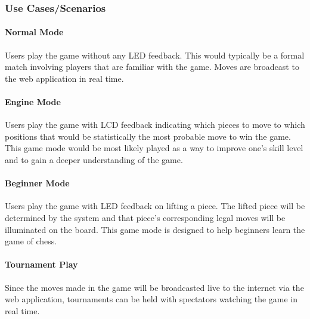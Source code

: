 \documentclass[12pt]{article}
\begin{document}
\subsubsection{Use Cases/Scenarios}{
    
    \paragraph{Normal Mode}{
        Users play the game without any LED feedback. This would typically be a formal match involving players that are familiar with the game. Moves are broadcast to the
        web application in real time.
    }
        
    \paragraph{Engine Mode}{
        Users play the game with LCD feedback indicating which pieces to move to which positions that would be statistically the most probable move to win the game. This game mode would
        be most likely played as a way to improve one's skill level and to gain a deeper understanding of the game.
    }
    
    \paragraph{Beginner Mode}{
        Users play the game with LED feedback on lifting a piece. The lifted piece will be determined by the system and that piece's corresponding legal moves will be illuminated on the board. This game
        mode is designed to help beginners learn the game of chess.
    }
    
    \paragraph{Tournament Play}{
        Since the moves made in the game will be broadcasted live to the internet via the web application, tournaments can be held with spectators watching the game in real time.
    }
}
\end{document}
